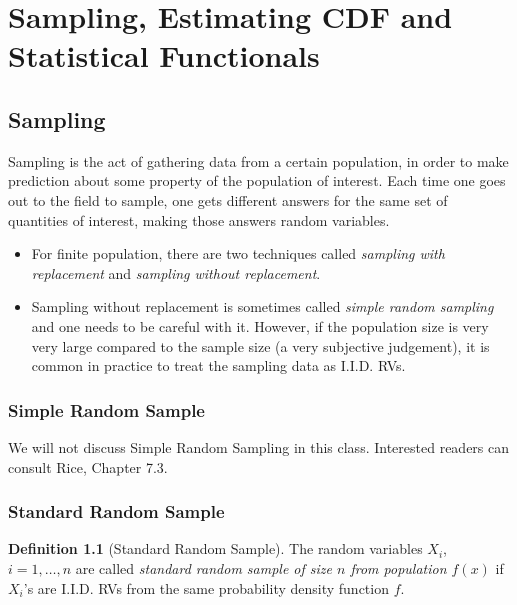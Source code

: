 \documentclass[
  openany]{book}
\theoremstyle{definition}
\newtheorem{definition}{Definition}[chapter]
\theoremstyle{definition}
\theoremstyle{definition}
\theoremstyle{definition}
\theoremstyle{remark}
\begin{document}
\chapter{Sampling, Estimating CDF and Statistical Functionals}\label{sampling-estimating-cdf-and-statistical-functionals}

\section{Sampling}\label{sampling}

Sampling is the act of gathering data from a certain
population, in order to make prediction about some property
of the population of interest.
Each time one goes out to the field to sample, one gets different
answers for the same set of quantities of interest, making those
answers random variables.

\begin{itemize}
\item
  For finite population, there are two techniques called \emph{sampling with replacement} and
  \emph{sampling without replacement}.
\item
  Sampling without replacement is sometimes called \emph{simple random sampling} and
  one needs to be careful with it. However, if the population size is very very large
  compared to the sample size (a very subjective judgement),
  it is common in practice to treat the sampling data as I.I.D. RVs.
\end{itemize}

\subsection{Simple Random Sample}\label{simple-random-sample}

We will not discuss Simple Random Sampling in this class.
Interested readers can consult Rice, Chapter 7.3.

\subsection{Standard Random Sample}\label{standard-random-sample}

\begin{definition}[Standard Random Sample]
\protect\hypertarget{def:stdSample}{}\label{def:stdSample}The random variables \(X_i\), \(i = 1,\dots , n\) are called \emph{standard random sample of
size \(n\) from population \(f(x)\)} if \(X_i\)'s are I.I.D. RVs from the same
probability density function \(f\).
\end{definition}
\end{document}
